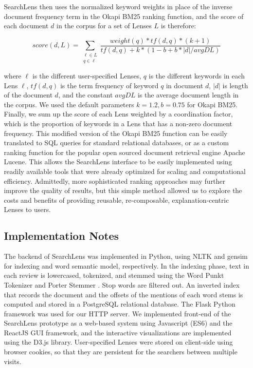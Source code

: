 \documentclass{sigchi}
\begin{document}
SearchLens then uses the normalized keyword weights in place of the inverse document frequency term in the Okapi BM25 ranking function, and the score of each document $d$ in the corpus for a set of Lenses $L$ is therefore:

$$score(d, L) = \sum_{\substack{\ell \in L \\ q \in \ell}}\frac{weight(q) * tf(d, q) * (k+1)} { tf(d, q) + k * (1 - b + b *|d| / avgDL)}$$

where $\ell$ is the different user-specified Lenses, $q$ is the different keywords in each Lens $\ell$, $tf(d,q)$ is the term frequency of keyword $q$ in document $d$, $|d|$ is length of the document $d$, and the constant $avgDL$ is the average document length in the corpus. We used the default parameters $k=1.2, b=0.75$ for Okapi BM25. Finally, we sum up the score of each Lens weighted by a coordination factor, which is the proportion of keywords in a Lens that has a non-zero document frequency. This modified version of the Okapi BM25 function can be easily translated to SQL queries for standard relational databases, or as a custom ranking function for the popular open sourced document retrieval engine Apache Lucene. This allows the SearchLens interface to be easily implemented using readily available tools that were already optimized for scaling and computational efficiency. Admittedly, more sophisticated ranking approaches may further improve the quality of results, but this simple method allowed us to explore the costs and benefits of providing reusable, re-composable, explanation-centric Lenses to users.


\subsection{Implementation Notes}


The backend of SearchLens was implemented in Python, using NLTK \cite{bird2004nltk} and gensim \cite{rehurek_lrec} for indexing and word semantic model, respectively. In the indexing phase, text in each review is lowercased, tokenized, and stemmed using the Word Punkt Tokenizer \cite{jurish2013word} and Porter Stemmer \cite{van1980new}. Stop words are filtered out. An inverted index that records the document and the offsets of the mentions of each word stems is computed and stored in a PostgreSQL relational database. The Flask Python framework was used for our HTTP server. We implemented front-end of the SearchLens prototype as a web-based system using Javascript (ES6) and the ReactJS GUI framework, and the interactive visualizations are implemented using the D3.js library. User-specified Lenses were stored on client-side using browser cookies, so that they are persistent for the searchers between multiple visits.
\end{document}
